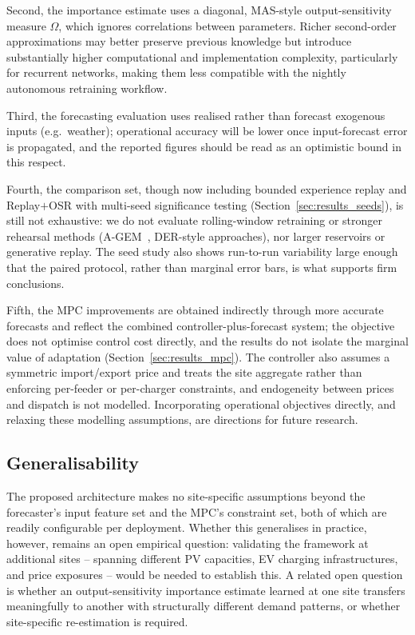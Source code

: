 \documentclass[journal]{IEEEtran}
\begin{document}
Second, the importance estimate uses a diagonal, MAS-style
output-sensitivity measure $\Omega$, which ignores correlations between
parameters. Richer second-order approximations may better preserve
previous knowledge but introduce substantially higher computational and
implementation complexity, particularly for recurrent networks, making
them less compatible with the nightly autonomous retraining workflow.

Third, the forecasting evaluation uses realised rather than forecast
exogenous inputs (e.g.\ weather); operational accuracy will be lower once
input-forecast error is propagated, and the reported figures should be
read as an optimistic bound in this respect.

Fourth, the comparison set, though now including bounded experience replay
and Replay${+}$OSR with multi-seed significance testing
(Section~\ref{sec:results_seeds}), is still not exhaustive: we do not
evaluate rolling-window retraining or stronger rehearsal methods
(A-GEM~\cite{chaudhry2019efficient}, DER-style
approaches), nor larger reservoirs or generative replay. The seed study also
shows run-to-run variability large enough that the paired protocol, rather
than marginal error bars, is what supports firm conclusions.

Fifth, the MPC improvements are obtained indirectly through more accurate
forecasts and reflect the combined controller-plus-forecast system; the
objective does not optimise control cost directly, and the results do not
isolate the marginal value of adaptation (Section~\ref{sec:results_mpc}).
The controller also assumes a symmetric import/export price and treats
the site aggregate rather than enforcing per-feeder or per-charger
constraints, and endogeneity between prices and dispatch is not modelled.
Incorporating operational objectives directly, and relaxing these
modelling assumptions, are directions for future research.
\subsection{Generalisability}

The proposed architecture makes no site-specific assumptions beyond
the forecaster's input feature set and the MPC's constraint set, both
of which are readily configurable per deployment. Whether this
generalises in practice, however, remains an open empirical question:
validating the framework at additional sites --
spanning different PV capacities, EV charging infrastructures, and
price exposures -- would be needed to establish this. A related open
question is whether an output-sensitivity importance estimate learned at
one site transfers meaningfully to another with structurally different
demand patterns, or whether site-specific re-estimation is required.
\end{document}

